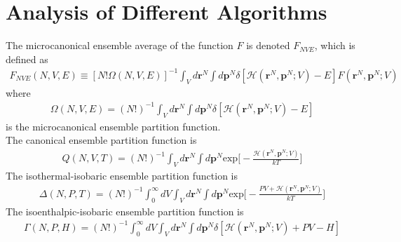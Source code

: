 \documentclass{article}
\begin{document}
\section{Analysis of Different Algorithms}
The microcanonical ensemble average of the function $F$ is denoted $F_{NVE}$, which is defined as
\begin{align}
F_{NVE}(N,V,E)\equiv [N!\Omega(N,V,E)]^{-1}\int_Vd\textbf{r}^N\int d\textbf{p}^N\delta[\mathscr{H}(\textbf{r}^N,\textbf{p}^N;V)-E]F(\textbf{r}^N,\textbf{p}^N;V)
\end{align}
where 
\begin{align}
\Omega(N,V,E)=(N!)^{-1}\int_Vd\textbf{r}^N\int d\textbf{p}^N\delta[\mathscr{H}(\textbf{r}^N,\textbf{p}^N;V)-E]
\end{align}
is the microcanonical ensemble partition function.\\
The canonical ensemble partition function is
\begin{align}
Q(N,V,T)=(N!)^{-1}\int_Vd\textbf{r}^N\int d\textbf{p}^N \text{exp}\big[-\frac{\mathscr{H}(\textbf{r}^N,\textbf{p}^N;V)}{kT}\big]
\end{align}
The isothermal-isobaric ensemble partition function is
\begin{align}
\Delta(N,P,T)=(N!)^{-1}\int^{\infty}_0dV\int_Vd\textbf{r}^N\int d\textbf{p}^N \text{exp}\big[-\frac{PV+\mathscr{H}(\textbf{r}^N,\textbf{p}^N;V)}{kT}\big]
\end{align}
The isoenthalpic-isobaric ensemble partition function is
\begin{align}
\Gamma(N,P,H)=(N!)^{-1}\int^{\infty}_0 dV\int_Vd\textbf{r}^N\int d\textbf{p}^N\delta[\mathscr{H}(\textbf{r}^N,\textbf{p}^N;V)+PV-H]
\end{align}
\end{document}
